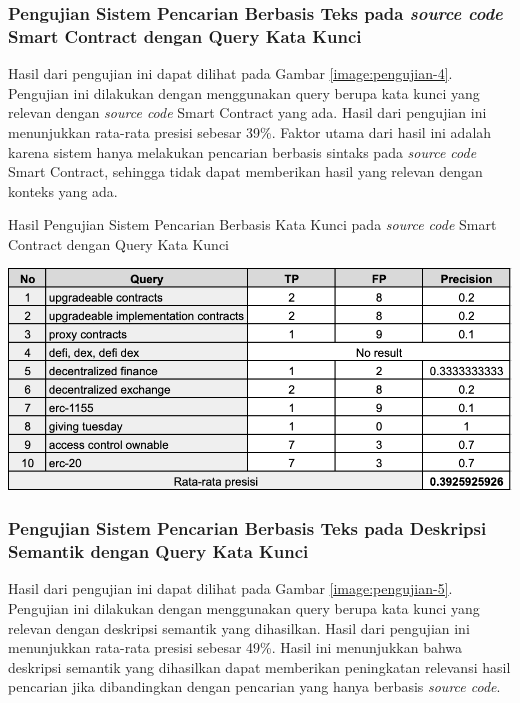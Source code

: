 \subsubsection{Pengujian Sistem Pencarian Berbasis Teks pada \textit{source code} Smart Contract dengan Query Kata Kunci}

Hasil dari pengujian ini dapat dilihat pada Gambar \ref{image:pengujian-4}. Pengujian ini dilakukan dengan menggunakan query berupa kata kunci yang relevan dengan \textit{source code} Smart Contract yang ada. Hasil dari pengujian ini menunjukkan rata-rata presisi sebesar 39\%. Faktor utama dari hasil ini adalah karena sistem hanya melakukan pencarian berbasis sintaks pada \textit{source code} Smart Contract, sehingga tidak dapat memberikan hasil yang relevan dengan konteks yang ada.

\begin{table}[ht]
	\centering
	\caption{Hasil Pengujian Sistem Pencarian Berbasis Kata Kunci pada \textit{source code} Smart Contract dengan Query Kata Kunci}
	\includegraphics[width=1\textwidth]{resources/chapter-4/data-1-4.png}
	\label{image:pengujian-4}
\end{table}

\subsubsection{Pengujian Sistem Pencarian Berbasis Teks pada Deskripsi Semantik dengan Query Kata Kunci}

Hasil dari pengujian ini dapat dilihat pada Gambar \ref{image:pengujian-5}. Pengujian ini dilakukan dengan menggunakan query berupa kata kunci yang relevan dengan deskripsi semantik yang dihasilkan. Hasil dari pengujian ini menunjukkan rata-rata presisi sebesar 49\%. Hasil ini menunjukkan bahwa deskripsi semantik yang dihasilkan dapat memberikan peningkatan relevansi hasil pencarian jika dibandingkan dengan pencarian yang hanya berbasis \textit{source code}.

